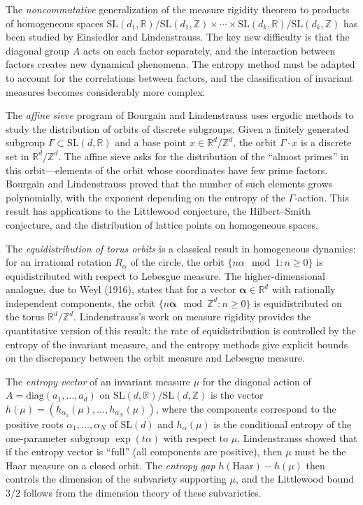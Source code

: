 The \emph{noncommutative} generalization of the measure rigidity theorem to products of homogeneous spaces $\text{SL}(d_1,\mathbb{R})/\text{SL}(d_1,\mathbb{Z}) \times \cdots \times \text{SL}(d_k,\mathbb{R})/\text{SL}(d_k,\mathbb{Z})$ has been studied by Einsiedler and Lindenstrauss. The key new difficulty is that the diagonal group $A$ acts on each factor separately, and the interaction between factors creates new dynamical phenomena. The entropy method must be adapted to account for the correlations between factors, and the classification of invariant measures becomes considerably more complex.

The \emph{affine sieve} program of Bourgain and Lindenstrauss uses ergodic methods to study the distribution of orbits of discrete subgroups. Given a finitely generated subgroup $\Gamma \subset \text{SL}(d,\mathbb{R})$ and a base point $x \in \mathbb{R}^d/\mathbb{Z}^d$, the orbit $\Gamma \cdot x$ is a discrete set in $\mathbb{R}^d/\mathbb{Z}^d$. The affine sieve asks for the distribution of the ``almost primes'' in this orbit---elements of the orbit whose coordinates have few prime factors. Bourgain and Lindenstrauss \cite{lindenstrauss2008} proved that the number of such elements grows polynomially, with the exponent depending on the entropy of the $\Gamma$-action. This result has applications to the Littlewood conjecture, the Hilbert--Smith conjecture, and the distribution of lattice points on homogeneous spaces.

The \emph{equidistribution of torus orbits} is a classical result in homogeneous dynamics: for an irrational rotation $R_\alpha$ of the circle, the orbit $\{n\alpha \mod 1 : n \ge 0\}$ is equidistributed with respect to Lebesgue measure. The higher-dimensional analogue, due to Weyl (1916), states that for a vector $\mathbf{\alpha} \in \mathbb{R}^d$ with rationally independent components, the orbit $\{n\mathbf{\alpha} \mod \mathbb{Z}^d : n \ge 0\}$ is equidistributed on the torus $\mathbb{R}^d/\mathbb{Z}^d$. Lindenstrauss's work on measure rigidity provides the quantitative version of this result: the rate of equidistribution is controlled by the entropy of the invariant measure, and the entropy methods give explicit bounds on the discrepancy between the orbit measure and Lebesgue measure.

The \emph{entropy vector} of an invariant measure $\mu$ for the diagonal action of $A = \text{diag}(a_1, \ldots, a_d)$ on $\text{SL}(d,\mathbb{R})/\text{SL}(d,\mathbb{Z})$ is the vector $h(\mu) = (h_{\alpha_1}(\mu), \ldots, h_{\alpha_N}(\mu))$, where the components correspond to the positive roots $\alpha_1, \ldots, \alpha_N$ of $\text{SL}(d)$ and $h_\alpha(\mu)$ is the conditional entropy of the one-parameter subgroup $\exp(t \alpha)$ with respect to $\mu$. Lindenstrauss showed that if the entropy vector is ``full'' (all components are positive), then $\mu$ must be the Haar measure on a closed orbit. The \emph{entropy gap} $h(\text{Haar}) - h(\mu)$ then controls the dimension of the subvariety supporting $\mu$, and the Littlewood bound $3/2$ follows from the dimension theory of these subvarieties.

